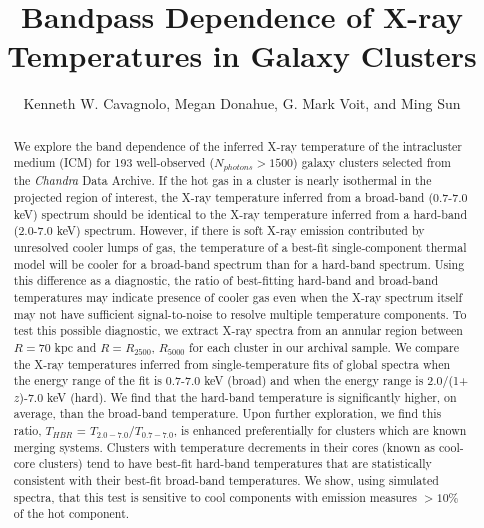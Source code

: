 \documentclass{emulateapj}
\begin{document}
\title{Bandpass Dependence of X-ray Temperatures in Galaxy Clusters}
\author{Kenneth W. Cavagnolo, Megan
Donahue, G. Mark Voit, and Ming
Sun}


\begin{abstract}

We explore the band dependence of the inferred X-ray temperature of
the intracluster medium (ICM) for 193 well-observed ($N_{photons} >
1500$) galaxy clusters selected from the {\it Chandra} Data Archive. If
the hot gas in a cluster is nearly isothermal in the projected region
of interest, the X-ray temperature inferred from a broad-band
(0.7-7.0 keV) spectrum should be identical to the X-ray temperature
inferred from a hard-band (2.0-7.0 keV) spectrum. However, if there is
soft X-ray emission contributed by unresolved cooler lumps of gas, the
temperature of a best-fit single-component thermal model will be
cooler for a broad-band spectrum than for a hard-band spectrum. Using
this difference as a diagnostic, the ratio of best-fitting hard-band
and broad-band temperatures may indicate presence of cooler gas even
when the X-ray spectrum itself may not have sufficient signal-to-noise
to resolve multiple temperature components. To test this possible
diagnostic, we extract X-ray spectra from an annular region between
$R=70$ kpc and $R=R_{2500}$, $R_{5000}$ for each cluster in our
archival sample. We compare the X-ray temperatures inferred from
single-temperature fits of global spectra when the energy range of the
fit is 0.7-7.0 keV (broad) and when the energy range is
2.0/(1+$z$)-7.0 keV (hard). We find that the hard-band temperature is
significantly higher, on average, than the broad-band
temperature. Upon further exploration, we find this ratio, $T_{HBR}$ =
$T_{2.0-7.0}$/$T_{0.7-7.0}$, is enhanced preferentially for clusters
which are known merging systems. Clusters with temperature decrements
in their cores (known as cool-core clusters) tend to have best-fit
hard-band temperatures that are statistically consistent with their
best-fit broad-band temperatures. We show, using simulated spectra,
that this test is sensitive to cool components with emission measures
$> 10\%$ of the hot component.
\end{abstract}
\end{document}
